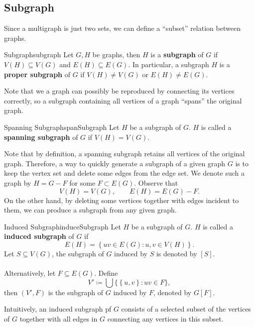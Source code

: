 \documentclass[math, code]{amznotes}
\theoremstyle{remark}
\begin{document}
\subsection{Subgraph}
Since a multigraph is just two sets, we can define a ``subset'' relation between graphs.
\begin{dfnbox}{Subgraph}{subgraph}
    Let $G, H$ be graphs, then $H$ is a {\color{red} \textbf{subgraph}} of $G$ if $V(H) \subseteq V(G)$ and $E(H) \subseteq E(G)$. In particular, a subgraph $H$ is a {\color{red} \textbf{proper subgraph}} of $G$ if $V(H) \neq V(G)$ or $E(H) \neq E(G)$.
\end{dfnbox}
Note that we a graph can possibly be reproduced by connecting its vertices correctly, so a subgraph containing all vertices of a graph ``spans'' the original graph.
\begin{dfnbox}{Spanning Subgraph}{spanSubgraph}
    Let $H$ be a subgraph of $G$. $H$ is called a {\color{red} \textbf{spanning subgraph}} of $G$ if $V(H) = V(G)$.
\end{dfnbox}
Note that by definition, a spanning subgraph retains all vertices of the original graph. Therefore, a way to quickly generate a subgraph of a given graph $G$ is to keep the vertex set and delete some edges from the edge set. We denote such a graph by $H = G - F$ for some $F \subset E(G)$. Observe that 
\begin{equation*}
    V(H) = V(G), \qquad E(H) = E(G) - F.
\end{equation*}
On the other hand, by deleting some vertices together with edges incident to them, we can produce a subgraph from any given graph.
\begin{dfnbox}{Induced Subgraph}{induceSubgraph}
    Let $H$ be a subgraph of $G$. $H$ is called a {\color{red} \textbf{induced subgraph}} of $G$ if
    \begin{equation*}
        E(H) = \left\{uv \in E(G) \colon u, v \in V(H)\right\}.
    \end{equation*}
    Let $S \subseteq V(G)$, the subgraph of $G$ induced by $S$ is denoted by $[S]$.
    \\\\
    Alternatively, let $F \subseteq E(G)$. Define
    \begin{equation*}
        V' \coloneqq \bigcup \bigl\{\left\{u, v\right\} \colon uv \in F\bigr\},
    \end{equation*}
    then $(V', F)$ is the subgraph of $G$ induced by $F$, denoted by $G[F]$.
\end{dfnbox}
Intuitively, an induced subgraph pf $G$ consists of a selected subset of the vertices of $G$ together with all edges in $G$ connecting any vertices in this subset.
\end{document}
